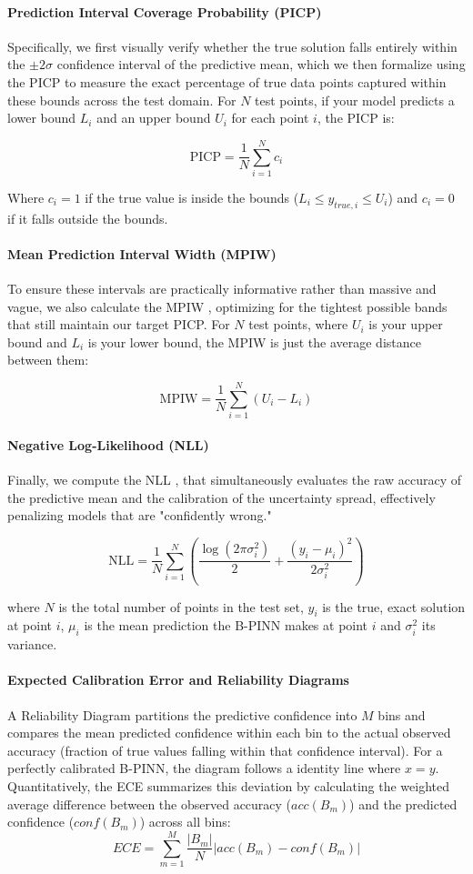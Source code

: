 \documentclass{article}
\begin{document}
\paragraph{Prediction Interval Coverage Probability (PICP)}
Specifically, we first visually verify whether the true solution falls entirely within the $\pm 2\sigma$ confidence interval of the predictive mean, which we then formalize using the PICP \cite{picp_mpiw} to measure the exact percentage of true data points captured within these bounds across the test domain. For $N$ test points, if your model predicts a lower bound $L_i$ and an upper bound $U_i$ for each point $i$, the PICP is:

$$\text{PICP} = \frac{1}{N} \sum_{i=1}^{N} c_i$$

Where $c_i = 1$ if the true value is inside the bounds ($L_i \le y_{true, i} \le U_i$) and $c_i = 0$ if it falls outside the bounds.

\paragraph{Mean Prediction Interval Width (MPIW)}
To ensure these intervals are practically informative rather than massive and vague, we also calculate the MPIW \cite{picp_mpiw}, optimizing for the tightest possible bands that still maintain our target PICP.  For $N$ test points, where $U_i$ is your upper bound and $L_i$ is your lower bound, the MPIW is just the average distance between them:

$$\text{MPIW} = \frac{1}{N} \sum_{i=1}^{N} (U_i - L_i)$$

\paragraph{ Negative Log-Likelihood (NLL)} Finally, we compute the NLL \cite{NLL}, that simultaneously evaluates the raw accuracy of the predictive mean and the calibration of the uncertainty spread, effectively penalizing models that are "confidently wrong."

$$\text{NLL} = \frac{1}{N} \sum_{i=1}^{N} \left( \frac{\log(2\pi\sigma_i^2)}{2} + \frac{(y_i - \mu_i)^2}{2\sigma_i^2} \right)$$

where $N$ is the total number of points in the test set, $y_i$ is the true, exact solution at point $i$, $\mu_i$ is the mean prediction the B-PINN makes at point $i$  and $\sigma_i^2$ its variance.
 
\paragraph{Expected Calibration Error and Reliability Diagrams \cite{ECE}}
A Reliability Diagram partitions the predictive confidence into $M$ bins and compares the mean predicted confidence within each bin to the actual observed accuracy (fraction of true values falling within that confidence interval). For a perfectly calibrated B-PINN, the diagram follows a identity line where $x=y$. Quantitatively, the ECE summarizes this deviation by calculating the weighted average difference between the observed accuracy ($acc(B_m)$) and the predicted confidence ($conf(B_m)$) across all bins:$$ECE = \sum_{m=1}^{M} \frac{|B_m|}{N} \left| acc(B_m) - conf(B_m) \right|$$
\end{document}

